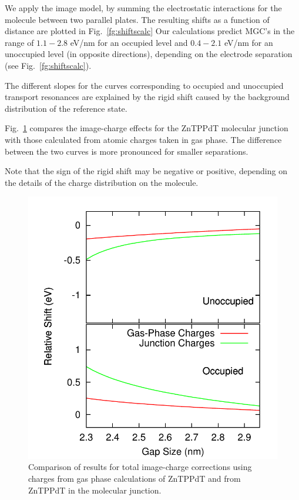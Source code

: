 \documentclass[aip,jcp,a4paper,reprint,floatfix,superscriptaddress]{revtex4-1}
\begin{document}
We apply the image model, by summing the electrostatic interactions for the molecule 
between two parallel plates. 
The resulting shifts as a function of distance are plotted in Fig.~\ref{fg:shiftscalc} 
Our calculations predict MGC's in the range of 
$1.1-2.8$ eV/nm for an occupied level and
$0.4-2.1$ eV/nm for an unoccupied level 
(in opposite directions), depending on the electrode separation (see Fig.~\ref{fg:shiftscalc}).

The different slopes for the curves corresponding to occupied and unoccupied transport resonances are explained by the rigid shift caused by the background distribution of the reference state.

Fig.~\ref{fg:gas_vs_junction} compares the image-charge effects for the ZnTPPdT molecular junction with those calculated from atomic charges taken in gas phase. 
The difference between the two curves is more pronounced for smaller separations.

Note that the sign of the rigid shift may be negative or positive, depending on the details of the charge distribution on the molecule. 

\begin{figure}
\includegraphics[width=.8\columnwidth]{img/Methods/Us_Gas_vs_Junction2}
\caption{Comparison of results for total image-charge corrections using charges from gas phase calculations of ZnTPPdT and from ZnTPPdT in the molecular junction.} \label{fg:gas_vs_junction}
\end{figure}
\end{document}
